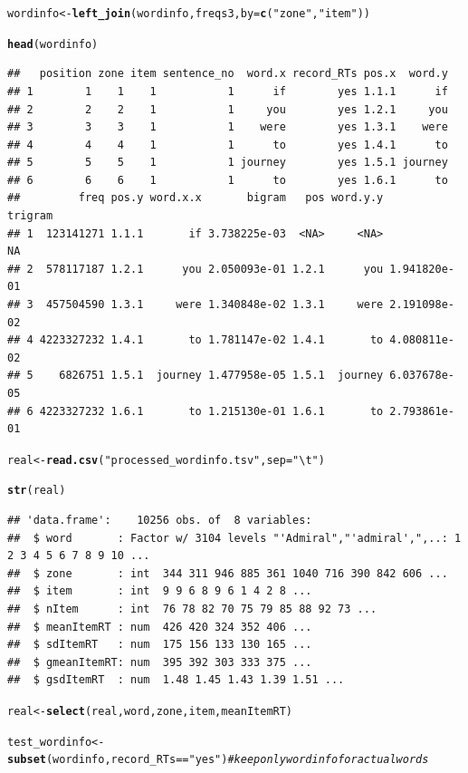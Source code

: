 \documentclass{article}\usepackage[]{graphicx}\usepackage[]{color}
\makeatletter
\newcommand{\hlstr}[1]{\textcolor[rgb]{0.192,0.494,0.8}{#1}}%
\newcommand{\hlcom}[1]{\textcolor[rgb]{0.678,0.584,0.686}{\textit{#1}}}%
\newcommand{\hlopt}[1]{\textcolor[rgb]{0,0,0}{#1}}%
\newcommand{\hlstd}[1]{\textcolor[rgb]{0.345,0.345,0.345}{#1}}%
\newcommand{\hlkwb}[1]{\textcolor[rgb]{0.69,0.353,0.396}{#1}}%
\newcommand{\hlkwc}[1]{\textcolor[rgb]{0.333,0.667,0.333}{#1}}%
\newcommand{\hlkwd}[1]{\textcolor[rgb]{0.737,0.353,0.396}{\textbf{#1}}}%
\newenvironment{kframe}{%
 \def\at@end@of@kframe{}%
 \ifinner\ifhmode%
  \def\at@end@of@kframe{\end{minipage}}%
  \begin{minipage}{\columnwidth}%
 \fi\fi%
 \def\FrameCommand##1{\hskip\@totalleftmargin \hskip-\fboxsep
 \colorbox{shadecolor}{##1}\hskip-\fboxsep
     \hskip-\linewidth \hskip-\@totalleftmargin \hskip\columnwidth}%
 \MakeFramed {\advance\hsize-\width
   \@totalleftmargin\z@ \linewidth\hsize
   \@setminipage}}%
 {\par\unskip\endMakeFramed%
 \at@end@of@kframe}
\newenvironment{knitrout}{}{} %
\makeatother
\begin{document}
\begin{knitrout}
\begin{kframe}
\begin{alltt}
\hlstd{wordinfo} \hlkwb{<-} \hlkwd{left_join}\hlstd{(wordinfo, freqs3,} \hlkwc{by} \hlstd{=} \hlkwd{c}\hlstd{(}\hlstr{"zone"}\hlstd{,} \hlstr{"item"}\hlstd{))}

\hlkwd{head}\hlstd{(wordinfo)}
\end{alltt}
\begin{verbatim}
##   position zone item sentence_no  word.x record_RTs pos.x  word.y
## 1        1    1    1           1      if        yes 1.1.1      if
## 2        2    2    1           1     you        yes 1.2.1     you
## 3        3    3    1           1    were        yes 1.3.1    were
## 4        4    4    1           1      to        yes 1.4.1      to
## 5        5    5    1           1 journey        yes 1.5.1 journey
## 6        6    6    1           1      to        yes 1.6.1      to
##         freq pos.y word.x.x       bigram   pos word.y.y      trigram
## 1  123141271 1.1.1       if 3.738225e-03  <NA>     <NA>           NA
## 2  578117187 1.2.1      you 2.050093e-01 1.2.1      you 1.941820e-01
## 3  457504590 1.3.1     were 1.340848e-02 1.3.1     were 2.191098e-02
## 4 4223327232 1.4.1       to 1.781147e-02 1.4.1       to 4.080811e-02
## 5    6826751 1.5.1  journey 1.477958e-05 1.5.1  journey 6.037678e-05
## 6 4223327232 1.6.1       to 1.215130e-01 1.6.1       to 2.793861e-01
\end{verbatim}
\begin{alltt}
\hlstd{real} \hlkwb{<-} \hlkwd{read.csv}\hlstd{(}\hlstr{"processed_wordinfo.tsv"}\hlstd{,} \hlkwc{sep} \hlstd{=} \hlstr{"\textbackslash{}t"}\hlstd{)}

\hlkwd{str}\hlstd{(real)}
\end{alltt}
\begin{verbatim}
## 'data.frame':	10256 obs. of  8 variables:
##  $ word       : Factor w/ 3104 levels "'Admiral","'admiral',",..: 1 2 3 4 5 6 7 8 9 10 ...
##  $ zone       : int  344 311 946 885 361 1040 716 390 842 606 ...
##  $ item       : int  9 9 6 8 9 6 1 4 2 8 ...
##  $ nItem      : int  76 78 82 70 75 79 85 88 92 73 ...
##  $ meanItemRT : num  426 420 324 352 406 ...
##  $ sdItemRT   : num  175 156 133 130 165 ...
##  $ gmeanItemRT: num  395 392 303 333 375 ...
##  $ gsdItemRT  : num  1.48 1.45 1.43 1.39 1.51 ...
\end{verbatim}
\begin{alltt}
\hlstd{real} \hlkwb{<-} \hlkwd{select}\hlstd{(real, word, zone, item, meanItemRT)}

\hlstd{test_wordinfo} \hlkwb{<-} \hlkwd{subset}\hlstd{(wordinfo, record_RTs} \hlopt{==} \hlstr{"yes"}\hlstd{)}  \hlcom{# keep only wordinfo for actual words}


\end{alltt}
\end{kframe}
\end{knitrout}
\end{document}
